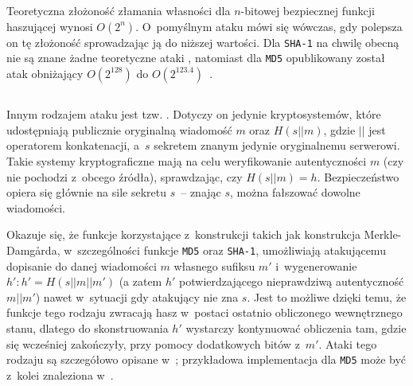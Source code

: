 Teoretyczna złożoność złamania własności  dla
$n$-bitowej bezpiecznej funkcji haszującej wynosi $O(2^n)$. O~pomyślnym ataku
mówi się wówczas, gdy polepsza on tę złożoność sprowadzając ją do niższej
wartości. Dla \texttt{SHA-1} na chwilę obecną nie są znane żadne teoretyczne
ataki , natomiast dla \texttt{MD5} opublikowany został atak
obniżający $O(2^{128})$ do $O(2^{123.4})$~\cite{best_md5_preimage_attack}.



\label{sec:length_extension_attack}%
\subsection{}
Innym rodzajem ataku jest tzw. . Dotyczy on jedynie
kryptosystemów, które udostępniają publicznie oryginalną wiadomość $m$ oraz
$H(s || m)$, gdzie $||$ jest operatorem konkatenacji, a~$s$ sekretem znanym
jedynie oryginalnemu serwerowi. Takie systemy kryptograficzne mają na celu
weryfikowanie autentyczności $m$ (czy nie pochodzi z~obcego źródła),
sprawdzając, czy $H(s||m)=h$. Bezpieczeństwo opiera się głównie na sile sekretu
$s$~-- znając $s$, można fałszować dowolne wiadomości.

Okazuje się, że funkcje korzystające z~konstrukcji takich jak konstrukcja
Merkle-Damg\r{a}rda, w~szczególności funkcje \texttt{MD5} oraz \texttt{SHA-1},
umożliwiają atakującemu dopisanie do danej wiadomości $m$ własnego sufiksu $m'$
i~wygenerowanie $h' : h' = H(s || m || m')$ (a zatem $h'$ potwierdzającego
nieprawdziwą autentyczność $m||m'$) nawet w~sytuacji gdy atakujący nie zna $s$.
Jest to możliwe dzięki temu, że funkcje tego rodzaju zwracają hasz w~postaci
ostatnio obliczonego wewnętrznego stanu, dlatego do skonstruowania $h'$
wystarczy kontynuować obliczenia tam, gdzie się wcześniej zakończyły, przy
pomocy dodatkowych bitów z~$m'$. Ataki tego rodzaju są szczegółowo opisane
w~\cite{md5_length_extension_attack}; przykładowa implementacja dla
\texttt{MD5} może być z~kolei znaleziona
w~\cite{md5_length_extension_attack_implementation}.
